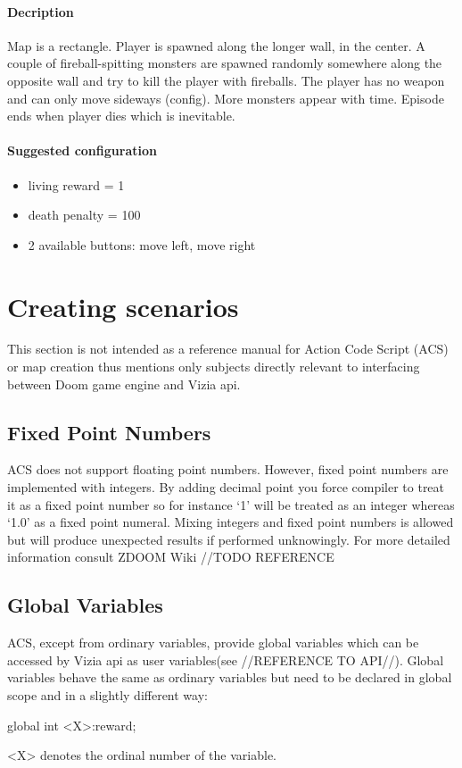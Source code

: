 		\paragraph{Decription}
			Map is a rectangle. Player is spawned along the longer wall, in the center. A couple of fireball-spitting monsters are spawned randomly somewhere along the opposite wall and try to kill the player with fireballs. The player has no weapon and can only move sideways (config). More monsters appear with time. Episode ends when player dies which is inevitable.

		\paragraph{Suggested configuration}
		\begin{itemize}
			\item living reward = 1
			\item death penalty = 100
			\item 2 available buttons: move left, move right
		\end{itemize}
	\newpage


\section{Creating scenarios}\label{sec:creating_scenarios}
	This section is not intended as a reference manual for Action Code Script (ACS) or map creation thus mentions only subjects directly relevant to interfacing between Doom game engine and Vizia api.


	\subsection{Fixed Point Numbers}\label{subsec:fixed_point}
		ACS does not support floating point numbers. However, fixed point numbers are implemented with integers. By adding decimal point you force compiler to treat it as a fixed point number so for instance `1' will be treated as an integer whereas `1.0' as a fixed point numeral. Mixing integers and fixed point numbers is allowed but will produce unexpected results if performed unknowingly. For more detailed information consult ZDOOM Wiki //TODO REFERENCE

	\subsection{Global Variables}\label{subsec:global_variable}
		ACS, except from ordinary variables, provide global variables which can be accessed by Vizia api as user variables(see //REFERENCE TO API//). Global variables behave the same as ordinary variables but need to be declared in global scope and in a slightly different way:
		\begin{clinee}
global int <X>:reward;
		\end{clinee}
		<X> denotes the ordinal number of the variable.
		
